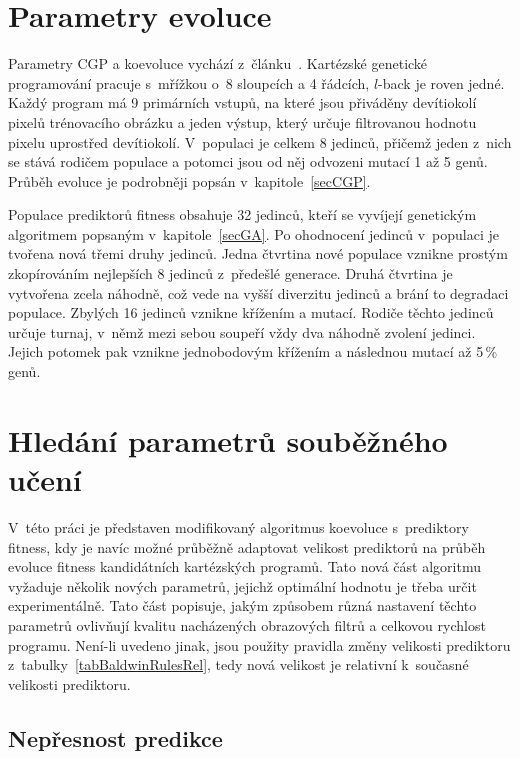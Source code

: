 \section{Parametry evoluce}
\label{secExpEvoParams}

Parametry CGP a koevoluce vychází z~článku~\cite{SikuPPSN}. Kartézské genetické programování pracuje s~mřížkou o~8 sloupcích a 4 řádcích, $l$-back je roven jedné. Každý program má 9 primárních vstupů, na které jsou přiváděny devítiokolí pixelů trénovacího obrázku a jeden výstup, který určuje filtrovanou hodnotu pixelu uprostřed devítiokolí. V~populaci je celkem 8 jedinců, přičemž jeden z~nich se stává rodičem populace a potomci jsou od něj odvozeni mutací 1 až 5 genů. Průběh evoluce je podrobněji popsán v~kapitole~\ref{secCGP}.

Populace prediktorů fitness obsahuje 32 jedinců, kteří se vyvíjejí genetickým algoritmem popsaným v~kapitole~\ref{secGA}. Po ohodnocení jedinců v~populaci je tvořena nová třemi druhy jedinců. Jedna čtvrtina nové populace vznikne prostým zkopírováním nejlepších 8 jedinců z~předešlé generace. Druhá čtvrtina je vytvořena zcela náhodně, což vede na vyšší diverzitu jedinců a brání to degradaci populace. Zbylých 16 jedinců vznikne křížením a mutací. Rodiče těchto jedinců určuje turnaj, v~němž mezi sebou soupeří vždy dva náhodně zvolení jedinci. Jejich potomek pak vznikne jednobodovým křížením a následnou mutací až 5\,\% genů.

\section{Hledání parametrů souběžného učení}
\label{secExpColearnParams}

V~této práci je představen modifikovaný algoritmus koevoluce s~prediktory fitness, kdy je navíc možné průběžně adaptovat velikost prediktorů na průběh evoluce fitness kandidátních kartézských programů. Tato nová část algoritmu vyžaduje několik nových parametrů, jejichž optimální hodnotu je třeba určit experimentálně. Tato část popisuje, jakým způsobem různá nastavení těchto parametrů ovlivňují kvalitu nacházených obrazových filtrů a celkovou rychlost programu. Není-li uvedeno jinak, jsou použity pravidla změny velikosti prediktoru z~tabulky~\ref{tabBaldwinRulesRel}, tedy nová velikost je relativní k~současné velikosti prediktoru.

\subsection{Nepřesnost predikce}

